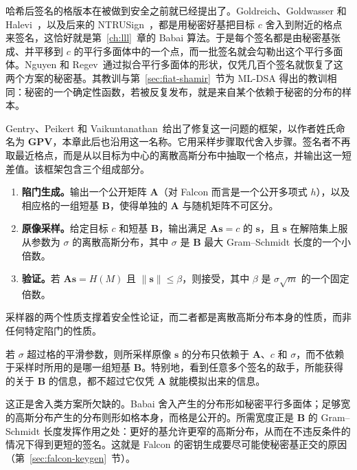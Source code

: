 哈希后签名的格版本在被做到安全之前就已经提出了。Goldreich、Goldwasser 和 Halevi~\cite{ggh1997}，以及后来的 NTRUSign~\cite{ntrusign2003}，都是用秘密好基把目标 $c$ 舍入到附近的格点来签名，这恰好就是第~\ref{ch:lll}~章的 Babai 算法。于是每个签名都是由秘密基张成、并平移到 $c$ 的平行多面体中的一个点，而一批签名就会勾勒出这个平行多面体。Nguyen 和 Regev~\cite{nguyenregev2006}通过拟合平行多面体的形状，仅凭几百个签名就恢复了这两个方案的秘密基。其教训与第~\ref{sec:fiat-shamir}~节为 ML-DSA 得出的教训相同：秘密的一个确定性函数，若被反复发布，就是来自某个依赖于秘密的分布的样本。

Gentry、Peikert 和 Vaikuntanathan~\cite{gpv2008}给出了修复这一问题的框架，以作者姓氏命名为 \textbf{GPV}，本章此后也沿用这一名称。它用采样步骤取代舍入步骤。签名者不再取最近格点，而是从以目标为中心的离散高斯分布中抽取一个格点，并输出这一短差值。该框架包含三个组成部分。

\begin{enumerate}
  \item \textbf{陷门生成。}输出一个公开矩阵 $\mathbf{A}$（对 Falcon 而言是一个公开多项式 $h$），以及相应格的一组短基 $\mathbf{B}$，使得单独的 $\mathbf{A}$ 与随机矩阵不可区分。
  \item \textbf{原像采样。}给定目标 $c$ 和短基 $\mathbf{B}$，输出满足 $\mathbf{A}\mathbf{s} = c$ 的 $\mathbf{s}$，且 $\mathbf{s}$ 在解陪集上服从参数为 $\sigma$ 的离散高斯分布，其中 $\sigma$ 是 $\mathbf{B}$ 最大 Gram--Schmidt 长度的一个小倍数。
  \item \textbf{验证。}若 $\mathbf{A}\mathbf{s} = H(M)$ 且 $\|\mathbf{s}\| \le \beta$，则接受，其中 $\beta$ 是 $\sigma\sqrt{m}$ 的一个固定倍数。
\end{enumerate}

采样器的两个性质支撑着安全性论证，而二者都是离散高斯分布本身的性质，而非任何特定陷门的性质。

\begin{proposition}[原像与陷门无关]
若 $\sigma$ 超过格的平滑参数，则所采样原像 $\mathbf{s}$ 的分布只依赖于 $\mathbf{A}$、$c$ 和 $\sigma$，而不依赖于采样时所用的是哪一组短基 $\mathbf{B}$。特别地，看到任意多个签名的敌手，所能获得的关于 $\mathbf{B}$ 的信息，都不超过它仅凭 $\mathbf{A}$ 就能模拟出来的信息。
\end{proposition}

这正是舍入类方案所欠缺的。Babai 舍入产生的分布形如秘密平行多面体；足够宽的高斯分布产生的分布则形如格本身，而格是公开的。所需宽度正是 $\mathbf{B}$ 的 Gram--Schmidt 长度发挥作用之处：更好的基允许更窄的高斯分布，从而在不违反条件的情况下得到更短的签名。这就是 Falcon 的密钥生成要尽可能使秘密基正交的原因（第~\ref{sec:falcon-keygen}~节）。

